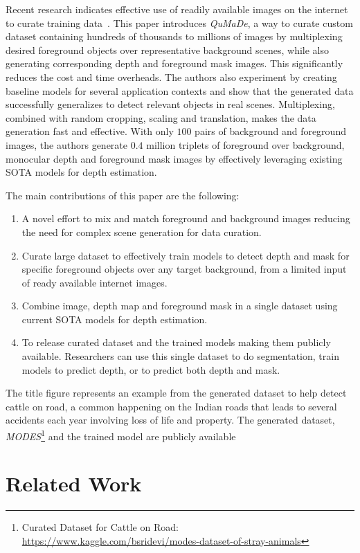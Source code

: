 \documentclass[review]{cvpr}
\begin{document}
Recent research indicates effective use of readily available images on the internet to curate training data~\cite{li2018megadepth}. This paper introduces \textit{QuMaDe}, a way to curate custom dataset containing hundreds of thousands to millions of images by multiplexing desired foreground objects over representative background scenes, while also generating corresponding depth and foreground mask images. This significantly reduces the cost and time overheads. The authors also experiment by creating baseline models for several application contexts and show that the generated data successfully generalizes to detect relevant objects in real scenes. Multiplexing, combined with random cropping, scaling and translation, makes the data generation fast and effective. With only $100$ pairs of background and foreground images, the authors generate $0.4$ million triplets of foreground over background, monocular depth and foreground mask images by effectively leveraging existing SOTA models for depth estimation.

The main contributions of this paper are the following:
\begin{enumerate}
\item A novel effort to mix and match foreground and background images reducing the need for complex scene generation for data curation.
\item Curate large dataset to effectively train models to detect depth and mask for specific foreground objects over any target background, from a limited input of ready available internet images.
\item Combine image, depth map and foreground mask in a single dataset using current SOTA models for depth estimation.
\item To release curated dataset and the trained models making them publicly available. Researchers can use this single dataset to do segmentation, train models to predict depth, or to predict both depth and mask.
\end{enumerate}
  

The title figure represents an example from the generated dataset to help detect cattle on road,  a common happening on the Indian roads that leads to several accidents each year involving loss of life and property. The generated dataset, \textit{MODES}\footnote{Curated Dataset for Cattle on Road: \url{https://www.kaggle.com/bsridevi/modes-dataset-of-stray-animals}} and the trained model are publicly available


\section {Related Work}
\end{document}
